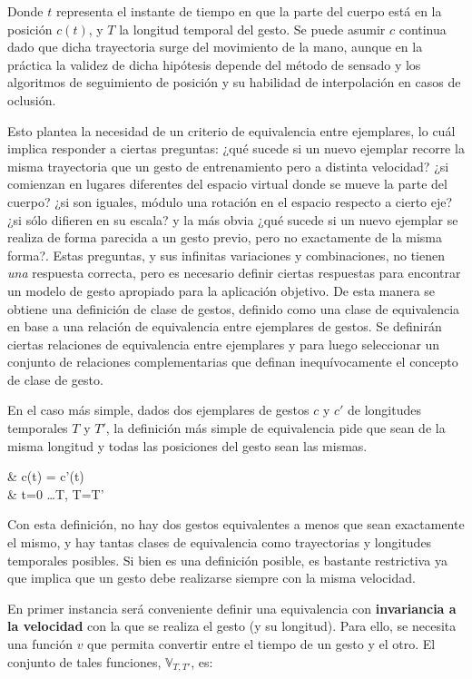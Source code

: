 Donde $t$ representa el instante de tiempo en que la parte del cuerpo está en la posición $c(t)$, y $T$ la longitud temporal del gesto. Se puede asumir $c$ continua dado que dicha trayectoria surge del movimiento de la mano, aunque en la práctica la validez de dicha hipótesis depende del método de sensado y los algoritmos de seguimiento de posición y su habilidad de interpolación en casos de oclusión. 

Esto plantea la necesidad de un criterio de equivalencia entre ejemplares, lo cuál implica responder a ciertas preguntas: ¿qué sucede si un nuevo ejemplar recorre la misma trayectoria que un gesto de entrenamiento pero a distinta velocidad? ¿si comienzan en lugares diferentes del espacio virtual donde se mueve la parte del cuerpo? ¿si son iguales, módulo una rotación en el espacio respecto a cierto eje? ¿si sólo difieren en su escala? y la más obvia ¿qué sucede si un nuevo ejemplar se realiza de forma parecida a un gesto previo, pero no exactamente de la misma forma?. Estas preguntas, y sus infinitas variaciones y combinaciones, no tienen \textit{una} respuesta correcta, pero es necesario definir ciertas respuestas para encontrar un modelo de gesto apropiado para la aplicación objetivo. De esta manera se obtiene una definición de clase de gestos, definido como una clase de equivalencia en base a una relación de equivalencia entre ejemplares de gestos. Se definirán ciertas relaciones de equivalencia entre ejemplares y para luego seleccionar un conjunto de relaciones complementarias que definan inequívocamente el concepto de clase de gesto.

En el caso más simple, dados dos ejemplares de gestos $c$ y $c'$ de longitudes temporales $T$ y $T'$, la definición más simple de equivalencia pide que sean de la misma longitud y todas las posiciones del gesto sean las mismas.
  

{ & c(t) = c'(t) 
\\ & t=0 \dots T, \; T=T'}   

Con esta definición, no hay dos gestos equivalentes a menos que sean exactamente el mismo, y hay tantas clases de equivalencia como trayectorias y longitudes temporales posibles. Si bien es una definición posible, es bastante restrictiva ya que implica que un gesto debe realizarse siempre con la misma velocidad.


\newcommand{\vset}{\mathbb{V}_{T,T'}}

En primer instancia será conveniente definir una equivalencia con \textbf{invariancia a la velocidad} con la que se realiza el gesto (y su longitud). Para ello, se necesita una función $v$ que permita convertir entre el tiempo de un gesto y el otro. El conjunto de tales funciones, $\vset$, es:


